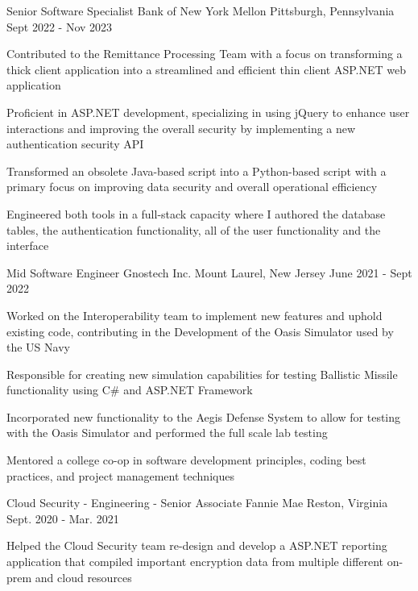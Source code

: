 \begin{cventries}
  \cventry
    {Senior Software Specialist}
    {Bank of New York Mellon}
    {Pittsburgh, Pennsylvania}
    {Sept 2022 - Nov 2023}
    {
      \begin{cvitems}
        \item {Contributed to the Remittance Processing Team with a focus on transforming a thick client application into a streamlined and efficient thin client ASP.NET web application}
        \item {Proficient in ASP.NET development, specializing in using jQuery to enhance user interactions and improving the overall security by implementing a new authentication security API}
        \item {Transformed an obsolete Java-based script into a Python-based script with a primary focus on improving data security and overall operational efficiency}
        \item {Engineered both tools in a full-stack capacity where I authored the database tables, the authentication functionality, all of the user functionality and the interface}
      \end{cvitems}
    }
  \cventry
    {Mid Software Engineer}
    {Gnostech Inc.}
    {Mount Laurel, New Jersey}
    {June 2021 - Sept 2022}
    {
      \begin{cvitems}
        \item {Worked on the Interoperability team to implement new features and uphold existing code, contributing in the Development of the Oasis Simulator used by the US Navy}
        \item {Responsible for creating new simulation capabilities for testing Ballistic Missile functionality using C\# and ASP.NET Framework}
        \item {Incorporated new functionality to the Aegis Defense System to allow for testing with the Oasis Simulator and performed the full scale lab testing}
        \item {Mentored a college co-op in software development principles, coding best practices, and project management techniques}
      \end{cvitems}
    }
  \cventry
    {Cloud Security - Engineering - Senior Associate}
    {Fannie Mae}
    {Reston, Virginia}
    {Sept. 2020 - Mar. 2021}
    {
      \begin{cvitems}
        \item {Helped the Cloud Security team re-design and develop a ASP.NET reporting application that compiled important encryption data from multiple different on-prem and cloud resources}

\end{cvitems}}
\end{cventries}
